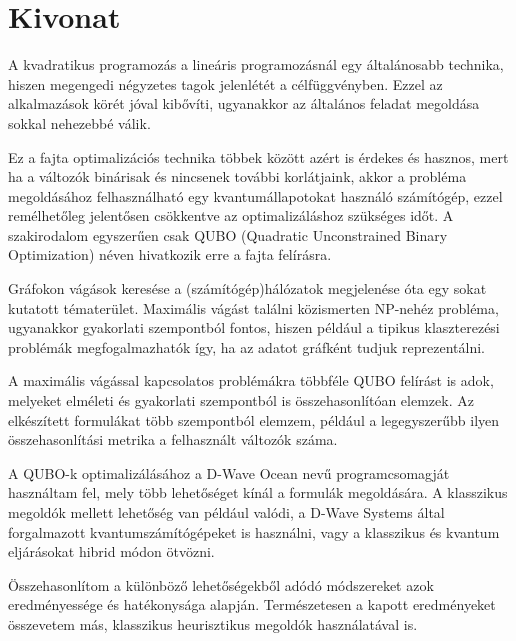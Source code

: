 
\setcounter{page}{1}

\selecthungarian

\chapter*{Kivonat}

A kvadratikus programozás a lineáris programozásnál egy általánosabb technika, hiszen megengedi négyzetes tagok jelenlétét a célfüggvényben. Ezzel az alkalmazások körét jóval kibővíti, ugyanakkor az általános feladat megoldása sokkal nehezebbé válik.

Ez a fajta optimalizációs technika többek között azért is érdekes és hasznos, mert ha a változók binárisak és nincsenek további korlátjaink, akkor a probléma megoldásához felhasználható egy kvantumállapotokat használó számítógép, ezzel remélhetőleg jelentősen csökkentve az optimalizáláshoz szükséges időt. A szakirodalom egyszerűen csak QUBO (Quadratic Unconstrained Binary Optimization) néven hivatkozik erre a fajta felírásra.

Gráfokon vágások keresése a (számítógép)hálózatok megjelenése óta egy sokat kutatott tématerület. Maximális vágást találni közismerten NP-nehéz probléma, ugyanakkor gyakorlati szempontból fontos, hiszen például a tipikus klaszterezési problémák megfogalmazhatók így, ha az adatot gráfként tudjuk reprezentálni.

A maximális vágással kapcsolatos problémákra többféle QUBO felírást is adok, melyeket elméleti és gyakorlati szempontból is összehasonlítóan elemzek. Az elkészített formulákat több szempontból elemzem, például a legegyszerűbb ilyen összehasonlítási metrika a felhasznált változók száma.

A QUBO-k optimalizálásához a  D-Wave Ocean nevű programcsomagját használtam fel, mely több lehetőséget kínál a formulák megoldására. A klasszikus megoldók mellett lehetőség van például valódi, a D-Wave Systems által forgalmazott kvantumszámítógépeket is használni, vagy a klasszikus és kvantum eljárásokat hibrid módon ötvözni.

Összehasonlítom a különböző lehetőségekből adódó módszereket azok eredményessége és hatékonysága alapján.
Természetesen a kapott eredményeket összevetem más, klasszikus heurisztikus megoldók használatával is.


